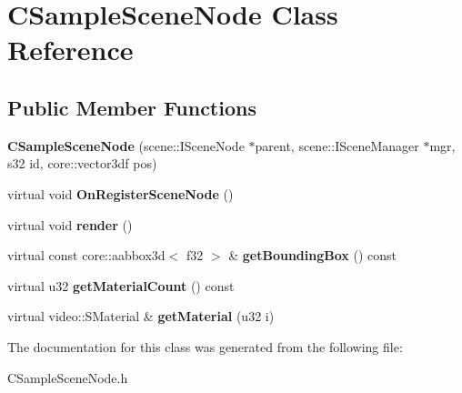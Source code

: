 \hypertarget{class_c_sample_scene_node}{
\section{CSampleSceneNode Class Reference}
\label{class_c_sample_scene_node}
}
\subsection*{Public Member Functions}
\begin{DoxyCompactItemize}
\item 
\hypertarget{class_c_sample_scene_node_aa86dd267abfd0c79469727a9cb08ae07}{
{\bfseries CSampleSceneNode} (scene::ISceneNode $\ast$parent, scene::ISceneManager $\ast$mgr, s32 id, core::vector3df pos)}
\label{class_c_sample_scene_node_aa86dd267abfd0c79469727a9cb08ae07}

\item 
\hypertarget{class_c_sample_scene_node_a827e561ac6cc59ed38fe8aef679f94ec}{
virtual void {\bfseries OnRegisterSceneNode} ()}
\label{class_c_sample_scene_node_a827e561ac6cc59ed38fe8aef679f94ec}

\item 
\hypertarget{class_c_sample_scene_node_acd9e4293a469e17818ad2b6df42ee46a}{
virtual void {\bfseries render} ()}
\label{class_c_sample_scene_node_acd9e4293a469e17818ad2b6df42ee46a}

\item 
\hypertarget{class_c_sample_scene_node_ab1298153a8ca69e6b085c0226ac7907e}{
virtual const core::aabbox3d$<$ f32 $>$ \& {\bfseries getBoundingBox} () const }
\label{class_c_sample_scene_node_ab1298153a8ca69e6b085c0226ac7907e}

\item 
\hypertarget{class_c_sample_scene_node_a076e41b85dca3dd50d910744061150f4}{
virtual u32 {\bfseries getMaterialCount} () const }
\label{class_c_sample_scene_node_a076e41b85dca3dd50d910744061150f4}

\item 
\hypertarget{class_c_sample_scene_node_a66ab14f7931132bb41c0a2c70b89816a}{
virtual video::SMaterial \& {\bfseries getMaterial} (u32 i)}
\label{class_c_sample_scene_node_a66ab14f7931132bb41c0a2c70b89816a}

\end{DoxyCompactItemize}


The documentation for this class was generated from the following file:\begin{DoxyCompactItemize}
\item 
CSampleSceneNode.h\end{DoxyCompactItemize}
